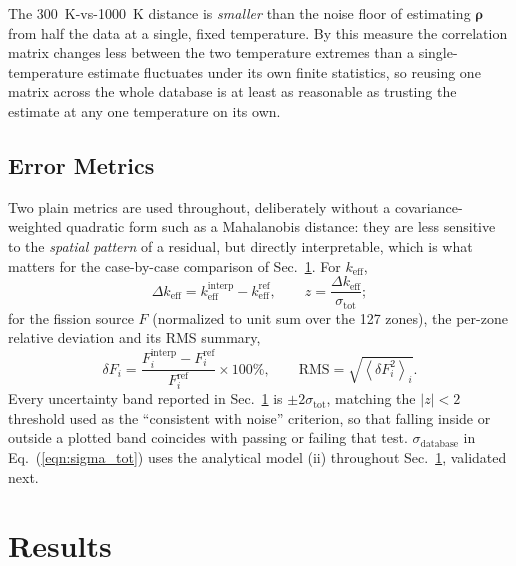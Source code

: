\documentclass{style/nseJournal}
\begin{document}
The 300~K-vs-1000~K distance is \emph{smaller} than the noise floor of estimating $\boldsymbol\rho$ from half the data at a single, fixed temperature. By this measure the correlation matrix changes less between the two temperature extremes than a single-temperature estimate fluctuates under its own finite statistics, so reusing one matrix across the whole database is at least as reasonable as trusting the estimate at any one temperature on its own.


\subsection{Error Metrics}
\label{sec:metrics}

Two plain metrics are used throughout, deliberately without a covariance-weighted quadratic form such as a Mahalanobis distance: they are less sensitive to the \emph{spatial pattern} of a residual, but directly interpretable, which is what matters for the case-by-case comparison of Sec.~\ref{sec:results}. For $k_{\text{eff}}$,
\begin{equation}
  \Delta k_{\text{eff}} = k_{\text{eff}}^{\text{interp}} - k_{\text{eff}}^{\text{ref}}, \qquad
  z = \frac{\Delta k_{\text{eff}}}{\sigma_{\text{tot}}} ;
  \label{eqn:metrics_keff}
\end{equation}
for the fission source $F$ (normalized to unit sum over the 127 zones), the per-zone relative deviation and its RMS summary,
\begin{equation}
  \delta F_i = \frac{F_i^{\text{interp}} - F_i^{\text{ref}}}{F_i^{\text{ref}}}\times 100\%, \qquad
  \mathrm{RMS} = \sqrt{\left\langle \delta F_i^2 \right\rangle_i} .
  \label{eqn:metrics_fs}
\end{equation}
Every uncertainty band reported in Sec.~\ref{sec:results} is $\pm2\sigma_{\text{tot}}$, matching the $|z|<2$ threshold used as the ``consistent with noise'' criterion, so that falling inside or outside a plotted band coincides with passing or failing that test. $\sigma_{\text{database}}$ in Eq.~(\ref{eqn:sigma_tot}) uses the analytical model (ii) throughout Sec.~\ref{sec:results}, validated next.


\section{Results}
\label{sec:results}
\end{document}
